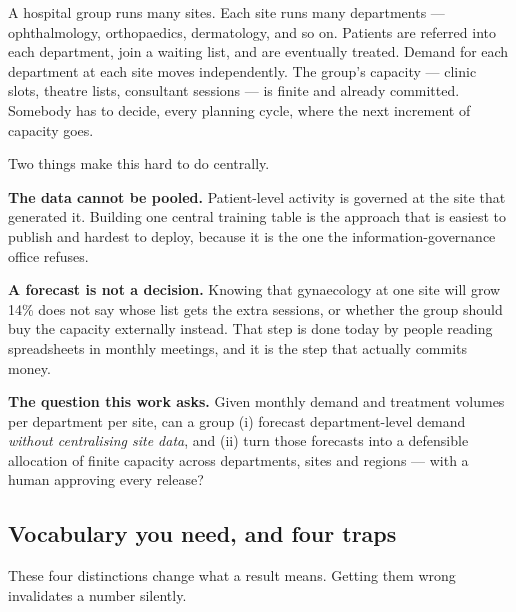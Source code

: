 \documentclass[11pt,a4paper]{article}
\newcommand{\keypoint}[1]{%
  \par\vspace{0.4em}%
  \noindent\colorbox{fed!8}{\parbox{0.98\textwidth}{\vspace{0.2em}#1\vspace{0.2em}}}%
  \par\vspace{0.4em}}
\begin{document}
A hospital group runs many sites. Each site runs many departments --- ophthalmology, orthopaedics,
dermatology, and so on. Patients are referred into each department, join a waiting list, and are
eventually treated. Demand for each department at each site moves independently. The group's capacity
--- clinic slots, theatre lists, consultant sessions --- is finite and already committed. Somebody has
to decide, every planning cycle, where the next increment of capacity goes.

Two things make this hard to do centrally.

\textbf{The data cannot be pooled.} Patient-level activity is governed at the site that generated it.
Building one central training table is the approach that is easiest to publish and hardest to deploy,
because it is the one the information-governance office refuses.

\textbf{A forecast is not a decision.} Knowing that gynaecology at one site will grow 14\% does not say
whose list gets the extra sessions, or whether the group should buy the capacity externally instead.
That step is done today by people reading spreadsheets in monthly meetings, and it is the step that
actually commits money.

\keypoint{\textbf{The question this work asks.} Given monthly demand and treatment volumes per
department per site, can a group (i) forecast department-level demand \emph{without centralising site
data}, and (ii) turn those forecasts into a defensible allocation of finite capacity across
departments, sites and regions --- with a human approving every release?}

\subsection{Vocabulary you need, and four traps}

These four distinctions change what a result means. Getting them wrong invalidates a number silently.
\end{document}
